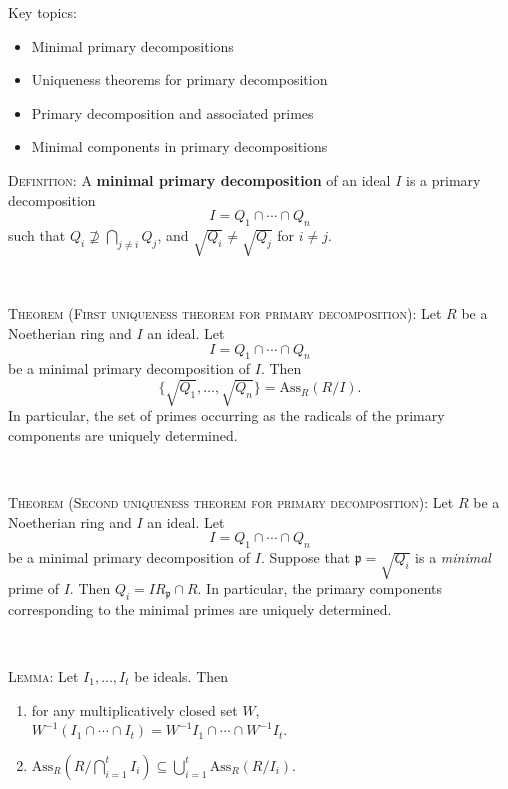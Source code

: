 \documentclass[12pt]{amsart}
\newcommand{\p}{\mathfrak{p}}
\newcommand{\Ass}{\mathrm{Ass}}
\newcommand{\0}{$\phantom{.}$}
\newcommand{\1}{\mathbbm{1}}
\begin{document}
  \begin{framed} Key topics:
\begin{itemize}
\item Minimal primary decompositions
\item Uniqueness theorems for primary decomposition
\item Primary decomposition and associated primes
\item Minimal components in primary decompositions
\end{itemize}
\end{framed}

\noindent \textsc{Definition:} A \textbf{minimal primary decomposition} of an ideal $I$ is a primary decomposition
\[ I = Q_1 \cap \cdots \cap Q_n\]
such that $Q_i \not\supseteq \bigcap_{j\neq i} Q_j$, and $\sqrt{Q_i} \neq \sqrt{Q_j}$ for $i\neq j$.

\

\noindent \textsc{Theorem (First uniqueness theorem for primary decomposition):} Let $R$ be a Noetherian ring and $I$ an ideal. Let \[I = Q_1 \cap \cdots \cap Q_n\] be a minimal primary decomposition of $I$. Then \[\{ \sqrt{Q_1},\dots,\sqrt{Q_n} \} = \Ass_R(R/I).\]
In particular, the set of primes occurring as the radicals of the primary components are uniquely determined.


\

\noindent \textsc{Theorem (Second uniqueness theorem for primary decomposition):} Let $R$ be a Noetherian ring and $I$ an ideal. Let \[I = Q_1 \cap \cdots \cap Q_n\] be a minimal primary decomposition of $I$. Suppose that $\p =\sqrt{Q_i}$ is a \emph{minimal} prime of $I$. Then ${Q_i = I R_{\p} \cap R}$.
In particular, the primary components corresponding to the minimal primes are uniquely determined.


\

\noindent \textsc{Lemma:} Let $I_1,\dots,I_t$ be ideals. Then
\begin{enumerate}
\item for any multiplicatively closed set $W$, $W^{-1}(I_1 \cap \cdots \cap I_t) = W^{-1} I_1 \cap \cdots \cap W^{-1}I_t$.
\item $\Ass_R\left(R/\bigcap_{i=1}^t I_i\right) \subseteq \bigcup_{i=1}^t \Ass_R(R/I_i)$.
\end{enumerate}




\begin{comment}


\end{comment}
\end{document}
